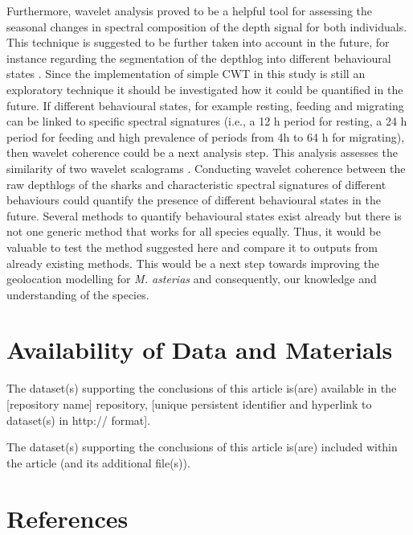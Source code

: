 \documentclass[
  authoryear,
  review,
  3p]{elsarticle}
\begin{document}
Furthermore, wavelet analysis proved to be a helpful tool for assessing
the seasonal changes in spectral composition of the depth signal for
both individuals. This technique is suggested to be further taken into
account in the future, for instance regarding the segmentation of the
depthlog into different behavioural states \citep[as already shown
by][]{soleymani_2017}. Since the implementation of simple CWT in this
study is still an exploratory technique it should be investigated how it
could be quantified in the future. If different behavioural states, for
example resting, feeding and migrating can be linked to specific
spectral signatures (i.e., a 12 h period for resting, a 24 h period for
feeding and high prevalence of periods from 4h to 64 h for migrating),
then wavelet coherence could be a next analysis step. This analysis
assesses the similarity of two wavelet scalograms \citep{grinsted_2004}.
Conducting wavelet coherence between the raw depthlogs of the sharks and
characteristic spectral signatures of different behaviours could
quantify the presence of different behavioural states in the future.
Several methods to quantify behavioural states exist already
\citep{pedersen_2008, heerah_2017} but there is not one generic method
that works for all species equally. Thus, it would be valuable to test
the method suggested here and compare it to outputs from already
existing methods. This would be a next step towards improving the
geolocation modelling for \emph{M. asterias} and consequently, our
knowledge and understanding of the species.

\hypertarget{availability-of-data-and-materials}{%
\section*{Availability of Data and
Materials}\label{availability-of-data-and-materials}}

The dataset(s) supporting the conclusions of this article is(are)
available in the {[}repository name{]} repository, {[}unique persistent
identifier and hyperlink to dataset(s) in http:// format{]}.

The dataset(s) supporting the conclusions of this article is(are)
included within the article (and its additional file(s)).

\hypertarget{references}{%
\section*{References}\label{references}}
\end{document}
